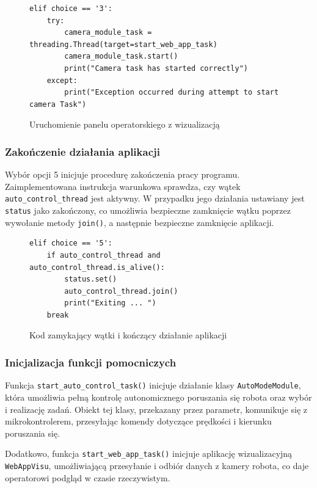 \begin{figure}[h!]
  \centering
  \begin{lstlisting}
elif choice == '3':
    try:
        camera_module_task = threading.Thread(target=start_web_app_task)
        camera_module_task.start()
        print("Camera task has started correctly")
    except:
        print("Exception occurred during attempt to start camera Task")
  \end{lstlisting}
  \caption{Uruchomienie panelu operatorskiego z wizualizacją}
  \label{fig:panel_task}
\end{figure}

\subsubsection{Zakończenie działania aplikacji}

Wybór opcji 5 inicjuje procedurę zakończenia pracy programu. Zaimplementowana instrukcja warunkowa sprawdza, czy wątek \texttt{auto\_control\_thread} jest aktywny. W przypadku jego działania ustawiany jest \texttt{status} jako zakończony, co umożliwia bezpieczne zamknięcie wątku poprzez wywołanie metody \texttt{join()}, a następnie bezpieczne zamknięcie aplikacji.

\begin{figure}[h!]
  \centering
  \begin{lstlisting}
elif choice == '5':
    if auto_control_thread and auto_control_thread.is_alive():
        status.set()
        auto_control_thread.join()
        print("Exiting ... ")
    break
  \end{lstlisting}
  \caption{Kod zamykający wątki i kończący działanie aplikacji}
  \label{fig:app_exit}
\end{figure}

\subsubsection{Inicjalizacja funkcji pomocniczych}
 
Funkcja \texttt{start\_auto\_control\_task()} inicjuje działanie klasy \texttt{AutoModeModule}, która umożliwia pełną kontrolę autonomicznego poruszania się robota oraz wybór i realizację zadań. Obiekt tej klasy, przekazany przez parametr, komunikuje się z mikrokontrolerem, przesyłając komendy dotyczące prędkości i kierunku poruszania się.

Dodatkowo, funkcja \texttt{start\_web\_app\_task()} inicjuje aplikację wizualizacyjną \texttt{WebAppVisu}, umożliwiającą przesyłanie i odbiór danych z kamery robota, co daje operatorowi podgląd w czasie rzeczywistym.

